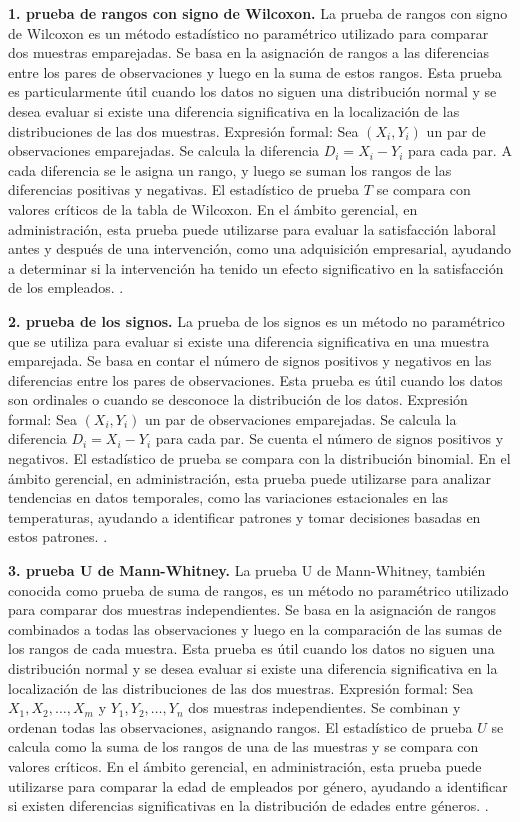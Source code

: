 {\textbf{1. prueba de rangos con signo de Wilcoxon.} La prueba de rangos con signo de Wilcoxon es un método estadístico no paramétrico utilizado para comparar dos muestras emparejadas. Se basa en la asignación de rangos a las diferencias entre los pares de observaciones y luego en la suma de estos rangos. Esta prueba es particularmente útil cuando los datos no siguen una distribución normal y se desea evaluar si existe una diferencia significativa en la localización de las distribuciones de las dos muestras. Expresión formal: Sea $(X_i, Y_i)$ un par de observaciones emparejadas. Se calcula la diferencia $D_i = X_i - Y_i$ para cada par. A cada diferencia se le asigna un rango, y luego se suman los rangos de las diferencias positivas y negativas. El estadístico de prueba $T$ se compara con valores críticos de la tabla de Wilcoxon. En el ámbito gerencial, en administración, esta prueba puede utilizarse para evaluar la satisfacción laboral antes y después de una intervención, como una adquisición empresarial, ayudando a determinar si la intervención ha tenido un efecto significativo en la satisfacción de los empleados. \citep{anderson2012,lind2012,wackerly2010}.

\textbf{2. prueba de los signos.} La prueba de los signos es un método no paramétrico que se utiliza para evaluar si existe una diferencia significativa en una muestra emparejada. Se basa en contar el número de signos positivos y negativos en las diferencias entre los pares de observaciones. Esta prueba es útil cuando los datos son ordinales o cuando se desconoce la distribución de los datos. Expresión formal: Sea $(X_i, Y_i)$ un par de observaciones emparejadas. Se calcula la diferencia $D_i = X_i - Y_i$ para cada par. Se cuenta el número de signos positivos y negativos. El estadístico de prueba se compara con la distribución binomial. En el ámbito gerencial, en administración, esta prueba puede utilizarse para analizar tendencias en datos temporales, como las variaciones estacionales en las temperaturas, ayudando a identificar patrones y tomar decisiones basadas en estos patrones. \citep{anderson2012,lind2012,wackerly2010}.

\textbf{3. prueba U de Mann-Whitney.} La prueba U de Mann-Whitney, también conocida como prueba de suma de rangos, es un método no paramétrico utilizado para comparar dos muestras independientes. Se basa en la asignación de rangos combinados a todas las observaciones y luego en la comparación de las sumas de los rangos de cada muestra. Esta prueba es útil cuando los datos no siguen una distribución normal y se desea evaluar si existe una diferencia significativa en la localización de las distribuciones de las dos muestras. Expresión formal: Sea $X_1, X_2, \ldots, X_m$ y $Y_1, Y_2, \ldots, Y_n$ dos muestras independientes. Se combinan y ordenan todas las observaciones, asignando rangos. El estadístico de prueba $U$ se calcula como la suma de los rangos de una de las muestras y se compara con valores críticos. En el ámbito gerencial, en administración, esta prueba puede utilizarse para comparar la edad de empleados por género, ayudando a identificar si existen diferencias significativas en la distribución de edades entre géneros. \citep{anderson2012,lind2012,wackerly2010}.

}

